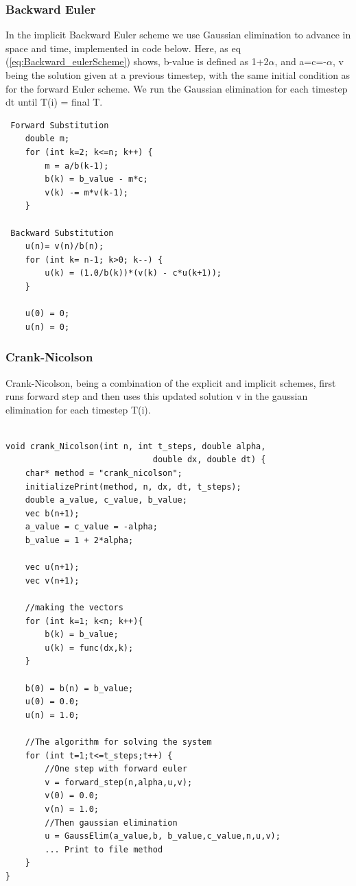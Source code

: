 \documentclass[a4paper,10pt]{article}
\begin{document}
\subsubsection{Backward Euler}
In the implicit Backward Euler scheme we use Gaussian elimination to advance in space and time, implemented in code below. Here, as eq (\ref{eq:Backward_eulerScheme}) shows, b-value is defined as
1+2$\alpha$, and a=c=-$\alpha$, v being the solution given at a previous timestep, with the same initial condition as for the forward Euler scheme. We run the Gaussian elimination for each timestep dt until T(i) = final T.

\begin{verbatim}
 Forward Substitution
    double m;
    for (int k=2; k<=n; k++) {
        m = a/b(k-1);
        b(k) = b_value - m*c;
        v(k) -= m*v(k-1);
    }

 Backward Substitution
    u(n)= v(n)/b(n);
    for (int k= n-1; k>0; k--) {
        u(k) = (1.0/b(k))*(v(k) - c*u(k+1));
    }

    u(0) = 0;
    u(n) = 0;
\end{verbatim}

\subsubsection{Crank-Nicolson}
Crank-Nicolson, being a combination of the explicit and implicit schemes, first runs forward step and then uses this updated solution v in the gaussian elimination for each timestep T(i).
\begin{verbatim}

void crank_Nicolson(int n, int t_steps, double alpha,
                              double dx, double dt) {
    char* method = "crank_nicolson";
    initializePrint(method, n, dx, dt, t_steps);
    double a_value, c_value, b_value;
    vec b(n+1);
    a_value = c_value = -alpha;
    b_value = 1 + 2*alpha;

    vec u(n+1);
    vec v(n+1);

    //making the vectors
    for (int k=1; k<n; k++){
        b(k) = b_value;
        u(k) = func(dx,k);
    }

    b(0) = b(n) = b_value;
    u(0) = 0.0;
    u(n) = 1.0;
    
    //The algorithm for solving the system
    for (int t=1;t<=t_steps;t++) {
        //One step with forward euler
        v = forward_step(n,alpha,u,v);
        v(0) = 0.0;
        v(n) = 1.0;
        //Then gaussian elimination
        u = GaussElim(a_value,b, b_value,c_value,n,u,v);
        ... Print to file method
    }
}
\end{verbatim}
\end{document}
